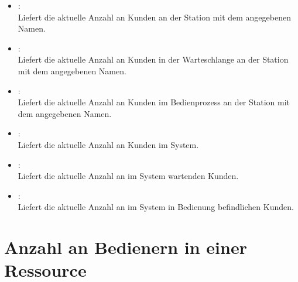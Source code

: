 \begin{itemize}
\item
{}:\\
Liefert die aktuelle Anzahl an Kunden an der Station mit dem angegebenen Namen.
  
\item
{}:\\
Liefert die aktuelle Anzahl an Kunden in der Warteschlange an der Station mit dem angegebenen Namen.

\item
{}:\\
Liefert die aktuelle Anzahl an Kunden im Bedienprozess an der Station mit dem angegebenen Namen.

\item
{}:\\
Liefert die aktuelle Anzahl an Kunden im System.
  
\item
{}:\\
Liefert die aktuelle Anzahl an im System wartenden Kunden.

\item
{}:\\
Liefert die aktuelle Anzahl an im System in Bedienung befindlichen Kunden.

\end{itemize}

\section{Anzahl an Bedienern in einer Ressource}

